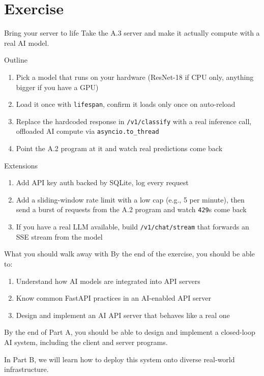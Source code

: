 \documentclass[aspectratio=169]{beamer}
\begin{document}
\section{Exercise}

\begin{frame}{Bring your server to life}
    Take the A.3 server and make it actually compute with a real AI model.

    \begin{block}{Outline}
        \begin{enumerate}
            \item Pick a model that runs on your hardware (ResNet-18 if CPU only, anything bigger if you have a GPU)
            \item Load it once with \texttt{lifespan}, confirm it loads only once on auto-reload
            \item Replace the hardcoded response in \texttt{/v1/classify} with a real inference call, offloaded AI compute via \texttt{asyncio.to\_thread}
            \item Point the A.2 program at it and watch real predictions come back
        \end{enumerate}
    \end{block}
\end{frame}

\begin{frame}{Extensions}
    \begin{enumerate}
        \item Add API key auth backed by SQLite, log every request
        \item Add a sliding-window rate limit with a low cap (e.g., 5 per minute), then send a burst of requests from the A.2 program and watch \texttt{429}s come back
        \item If you have a real LLM available, build \texttt{/v1/chat/stream} that forwards an SSE stream from the model
    \end{enumerate}
\end{frame}

\begin{frame}{What you should walk away with}
    By the end of the exercise, you should be able to:
    \begin{enumerate}
        \item Understand how AI models are integrated into API servers
        \item Know common FastAPI practices in an AI-enabled API server
        \item Design and implement an AI API server that behaves like a real one
    \end{enumerate}

    \vspace{0.5em}
By the end of Part A, you should be able to design and implement a closed-loop AI system, including the client and server programs.

    \vspace{0.5em}
In Part B, we will learn how to deploy this system onto diverse real-world infrastructure.
\end{frame}
\end{document}
